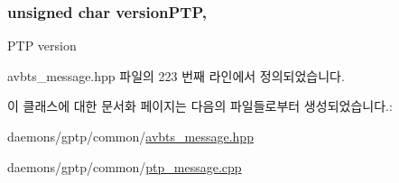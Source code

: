 \subsubsection[{\texorpdfstring{version\+P\+TP}{versionPTP}}]{\setlength{\rightskip}{0pt plus 5cm}unsigned char version\+P\+TP\hspace{0.3cm}{\ttfamily [protected]}, {\ttfamily [inherited]}}\hypertarget{class_p_t_p_message_common_aebd1e0693c6170ff1b08b2471db92a80}{}\label{class_p_t_p_message_common_aebd1e0693c6170ff1b08b2471db92a80}
P\+TP version 

avbts\+\_\+message.\+hpp 파일의 223 번째 라인에서 정의되었습니다.



이 클래스에 대한 문서화 페이지는 다음의 파일들로부터 생성되었습니다.\+:\begin{DoxyCompactItemize}
\item 
daemons/gptp/common/\hyperlink{avbts__message_8hpp}{avbts\+\_\+message.\+hpp}\item 
daemons/gptp/common/\hyperlink{ptp__message_8cpp}{ptp\+\_\+message.\+cpp}\end{DoxyCompactItemize}
